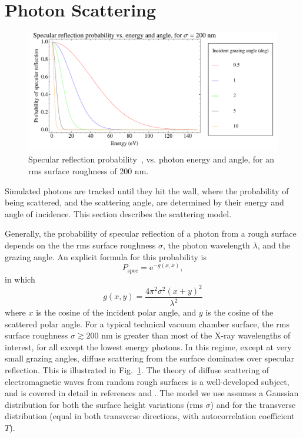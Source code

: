 \documentclass[11pt,openany]{report}
\begin{document}
\section{Photon Scattering} 

  \begin{figure}
  \centering
  \includegraphics[width=6in]{specular-probability.pdf}
  \caption[Specular reflection probability vs. photon energy and angle]
{\label{f:spec.prob}
Specular reflection probability~\cite{b:beckmann}, vs. photon energy
and angle, for an rms surface roughness of 200 nm.}
  \end{figure}
   
Simulated photons are tracked until they hit the wall, where the
probability of being scattered, and the scattering angle, are
determined by their energy and angle of incidence.  This section
describes the scattering model.

Generally, the probability of specular reflection of a photon from a
rough surface depends on the the rms surface roughness $\sigma$, the
photon wavelength $\lambda$, and the grazing angle. An explicit
formula for this probability is~\cite{b:beckmann}
   \begin{equation}
P_{\textrm{spec}}=\textrm{e}^{-g(x,x)},
\end{equation}
in which
   \begin{equation}
g(x,y)=\frac{4\pi^{2}\sigma^{2}(x+y)^{2}}{\lambda^{2}}
  \end{equation}
where $x$ is the cosine of the incident polar angle, and $y$ is the
cosine of the scattered polar angle. For a typical technical vacuum
chamber surface, the rms surface roughness $\sigma \gtrsim 200$ nm is
greater than most of the X-ray wavelengths of interest, for all except
the lowest energy photons. In this regime, except at very small
grazing angles, diffuse scattering from the surface dominates over
specular reflection. This is illustrated in Fig.~\ref{f:spec.prob}.
The theory of diffuse scattering of electromagnetic waves from random
rough surfaces is a well-developed subject, and is covered in detail
in references \cite{b:beckmann} and \cite{b:ogilvy}. The model we use
assumes a Gaussian distribution for both the surface height variations
(rms $\sigma$) and for the transverse distribution (equal in both
transverse directions, with autocorrelation coefficient $T$).
\end{document}
